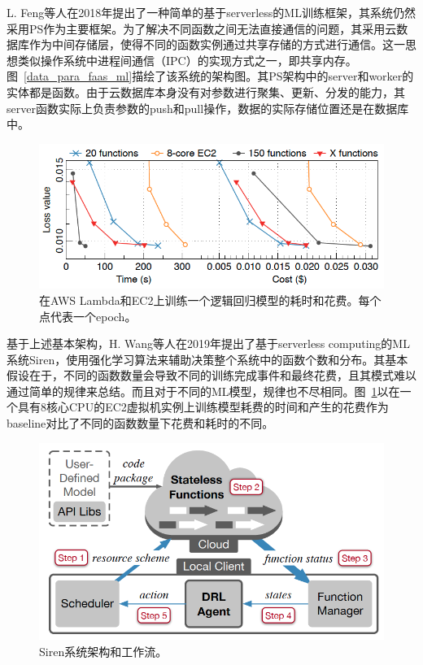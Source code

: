 L. Feng等人\parencite{feng2018exploring}在2018年提出了一种简单的基于serverless的ML训练框架，其系统仍然采用PS作为主要框架。为了解决不同函数之间无法直接通信的问题，其采用云数据库作为中间存储层，使得不同的函数实例通过共享存储的方式进行通信。这一思想类似操作系统中进程间通信（IPC）的实现方式之一，即共享内存。图~\ref{data_para_faas_ml}描绘了该系统的架构图。其PS架构中的server和worker的实体都是函数。由于云数据库本身没有对参数进行聚集、更新、分发的能力，其server函数实际上负责参数的push和pull操作，数据的实际存储位置还是在数据库中。

\begin{figure}[h]
    \centerline{\includegraphics[width=\textwidth]{figures/ec2-lambda-diff.png}}
    \caption{在AWS Lambda和EC2上训练一个逻辑回归模型的耗时和花费。每个点代表一个epoch。}
    \label{ec2_lambda_diff}
\end{figure}

基于上述基本架构，H. Wang等人\parencite{wang2019distributed}在2019年提出了基于serverless computing的ML系统Siren，使用强化学习算法来辅助决策整个系统中的函数个数和分布。其基本假设在于，不同的函数数量会导致不同的训练完成事件和最终花费，且其模式难以通过简单的规律来总结。而且对于不同的ML模型，规律也不尽相同。图~\ref{ec2_lambda_diff}以在一个具有8核心CPU的EC2虚拟机实例上训练模型耗费的时间和产生的花费作为baseline对比了不同的函数数量下花费和耗时的不同。

\begin{figure}[h]
    \centerline{\includegraphics[width=\textwidth]{figures/siren-arch.png}}
    \caption{Siren系统架构和工作流。}
    \label{siren_arch}
\end{figure}

